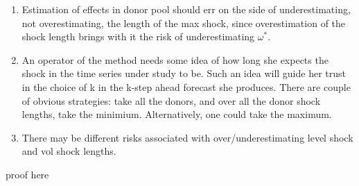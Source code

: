 \documentclass[11pt]{article}
\theoremstyle{definition}
\newenvironment{proof-of-proposition}[1][{}]{\noindent{\bf
    Proof of Proposition {#1}}
  \hspace*{.5em}}{\qed\bigskip\\}
\begin{document}
\begin{enumerate}
\item Estimation of effects in donor pool should err on the side of underestimating, not overestimating, the length of the max shock, since overestimation of the shock length brings with it the risk of underestimating $\omega^{*}$.
\item An operator of the method needs some idea of how long she expects the shock in the time series under study to be.  Such an idea will guide her trust in the choice of k in the k-step ahead forecast she produces.  There are couple of obvious strategies: take all the donors, and over all the donor shock lengths, take the minimium.  Alternatively, one could take the maximum.
\item There may be different risks associated with over/underestimating level shock and vol shock lengths.
\end{enumerate}

\begin{proof-of-proposition}
proof here
\end{proof-of-proposition}
\end{document}
